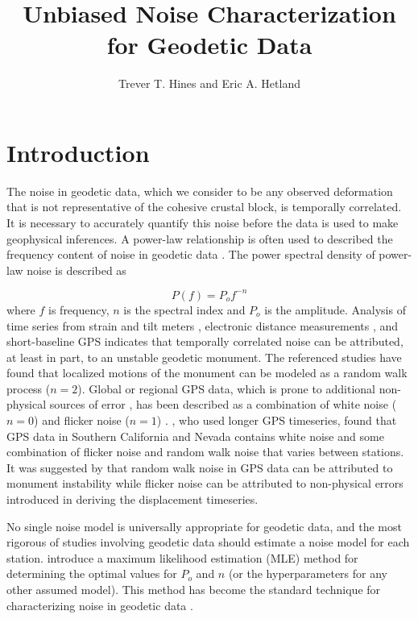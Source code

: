 \documentclass[10pt,a4paper]{article}
\title{Unbiased Noise Characterization for Geodetic Data}
\author{Trever T. Hines and Eric A. Hetland}
\begin{document}
\maketitle
\section{Introduction}\label{sec:Introduction}


The noise in geodetic data, which we consider to be any observed deformation that is not representative of the cohesive crustal block, is temporally correlated. It is necessary to accurately quantify this noise before the data is used to make geophysical inferences. A power-law relationship is often used to described the frequency content of noise in geodetic data \citep{Agnew1992}.  The power spectral density of power-law noise is described as 

\begin{equation}\label{eq.PowerLaw}
  P(f) = P_o f^{-n}
\end{equation}
where $f$ is frequency, $n$ is the spectral index and $P_o$ is the amplitude. Analysis of time series from strain and tilt meters \citep{Wyatt1982,Wyatt1989}, electronic distance measurements \citep{Langbein1997}, and short-baseline GPS \citep{King2009} indicates that temporally correlated noise can be attributed, at least in part, to an unstable geodetic monument. The referenced studies have found that localized motions of the monument can be modeled as a random walk process ($n=2$). Global or regional GPS data, which is prone to additional non-physical sources of error \citep[e.g.][]{King2010}, has been described as a combination of white noise ($n=0$) and flicker noise ($n=1$) \citep{Zhang1997,Mao1999,Williams2004}. \citet{Langbein2008}, who used longer GPS timeseries,  found that GPS data in Southern California and Nevada contains white noise and some combination of flicker noise and random walk noise that varies between stations. It was suggested by \citet{Langbein2008} that random walk noise in GPS data can be attributed to monument instability while flicker noise can be attributed to non-physical errors introduced in deriving the displacement timeseries.  

No single noise model is universally appropriate for geodetic data, and the most rigorous of studies involving geodetic data should estimate a noise model for each station.  \citet{Langbein1997} introduce a maximum likelihood estimation (MLE) method for determining the optimal values for $P_o$ and $n$ (or the hyperparameters for any other assumed model). This method has become the standard technique for characterizing noise in geodetic data \citep{Langbein2004,Langbein2008,Zhang1997,Mao1999,Williams2004,King2009,Murray2017}.  
\end{document}
